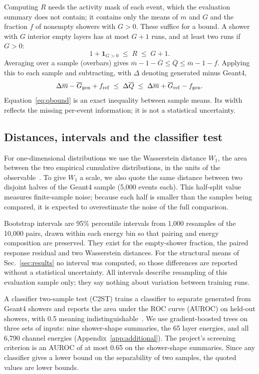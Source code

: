 \documentclass[11pt]{article}
\begin{document}
Computing $R$ needs the activity mask of each event, which the evaluation summary does not contain; it contains only the means of $m$ and $G$ and the fraction $f$ of nonempty showers with $G>0$. These suffice for a bound. A shower with $G$ interior empty layers has at most $G+1$ runs, and at least two runs if $G>0$:
\begin{equation}
 1+\mathbf 1_{G>0}\;\leq\;R\;\leq\;G+1 .
 \label{eq:rbound}
\end{equation}
Averaging over a sample (overbars) gives $\overline m-1-\overline G\leq\overline Q\leq\overline m-1-f$. Applying this to each sample and subtracting, with $\Delta$ denoting generated minus Geant4,
\begin{equation}
 \Delta\overline m-\overline G_{\rm gen}+f_{\rm ref}\;\leq\;\Delta\overline Q
 \;\leq\;\Delta\overline m+\overline G_{\rm ref}-f_{\rm gen}.
 \label{eq:qbound}
\end{equation}
Equation~\eqref{eq:qbound} is an exact inequality between sample means. Its width reflects the missing per-event information; it is not a statistical uncertainty.

\subsection{Distances, intervals and the classifier test}

For one-dimensional distributions we use the Wasserstein distance $W_1$, the area between the two empirical cumulative distributions, in the units of the observable~\cite{kansalmetrics}. To give $W_1$ a scale, we also quote the same distance between two disjoint halves of the Geant4 sample (5,000 events each). This half-split value measures finite-sample noise; because each half is smaller than the samples being compared, it is expected to overestimate the noise of the full comparison.

Bootstrap intervals are 95\% percentile intervals from 1,000 resamples of the 10,000 pairs, drawn within each energy bin so that pairing and energy composition are preserved. They exist for the empty-shower fraction, the paired response residual and two Wasserstein distances. For the structural means of Sec.~\ref{sec:results} no interval was computed, so those differences are reported without a statistical uncertainty. All intervals describe resampling of this evaluation sample only; they say nothing about variation between training runs.

A classifier two-sample test (C2ST) trains a classifier to separate generated from Geant4 showers and reports the area under the ROC curve (AUROC) on held-out showers, with 0.5 meaning indistinguishable~\cite{c2st,kansalmetrics}. We use gradient-boosted trees on three sets of inputs: nine shower-shape summaries, the 65 layer energies, and all 6,790 channel energies (Appendix~\ref{app:additional}). The project's screening criterion is an AUROC of at most 0.65 on the shower-shape summaries. Since any classifier gives a lower bound on the separability of two samples, the quoted values are lower bounds.
\end{document}
